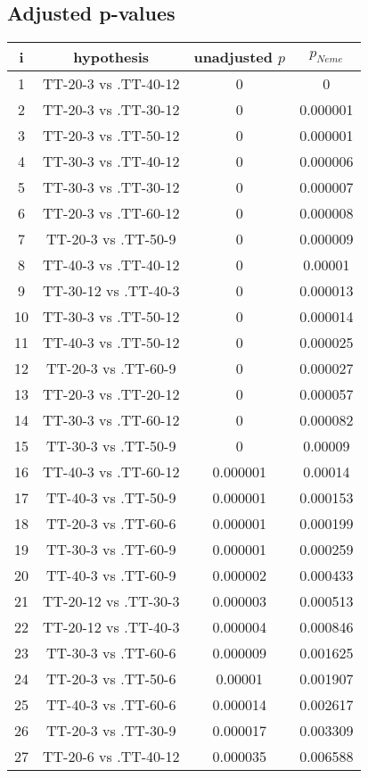 \documentclass[a4paper,10pt]{article}
\begin{document}
\begin{landscape}
\pagebreak

\subsection{Adjusted p-values}

\begin{table}[!htp]
\centering\scriptsize
\begin{tabular}{cccc}
i&hypothesis&unadjusted $p$&$p_{Neme}$\\
\hline1&TT-20-3 vs .TT-40-12&0&0\\
2&TT-20-3 vs .TT-30-12&0&0.000001\\
3&TT-20-3 vs .TT-50-12&0&0.000001\\
4&TT-30-3 vs .TT-40-12&0&0.000006\\
5&TT-30-3 vs .TT-30-12&0&0.000007\\
6&TT-20-3 vs .TT-60-12&0&0.000008\\
7&TT-20-3 vs .TT-50-9&0&0.000009\\
8&TT-40-3 vs .TT-40-12&0&0.00001\\
9&TT-30-12 vs .TT-40-3&0&0.000013\\
10&TT-30-3 vs .TT-50-12&0&0.000014\\
11&TT-40-3 vs .TT-50-12&0&0.000025\\
12&TT-20-3 vs .TT-60-9&0&0.000027\\
13&TT-20-3 vs .TT-20-12&0&0.000057\\
14&TT-30-3 vs .TT-60-12&0&0.000082\\
15&TT-30-3 vs .TT-50-9&0&0.00009\\
16&TT-40-3 vs .TT-60-12&0.000001&0.00014\\
17&TT-40-3 vs .TT-50-9&0.000001&0.000153\\
18&TT-20-3 vs .TT-60-6&0.000001&0.000199\\
19&TT-30-3 vs .TT-60-9&0.000001&0.000259\\
20&TT-40-3 vs .TT-60-9&0.000002&0.000433\\
21&TT-20-12 vs .TT-30-3&0.000003&0.000513\\
22&TT-20-12 vs .TT-40-3&0.000004&0.000846\\
23&TT-30-3 vs .TT-60-6&0.000009&0.001625\\
24&TT-20-3 vs .TT-50-6&0.00001&0.001907\\
25&TT-40-3 vs .TT-60-6&0.000014&0.002617\\
26&TT-20-3 vs .TT-30-9&0.000017&0.003309\\
27&TT-20-6 vs .TT-40-12&0.000035&0.006588\\

\end{tabular}
\end{table}
\end{landscape}
\end{document}
